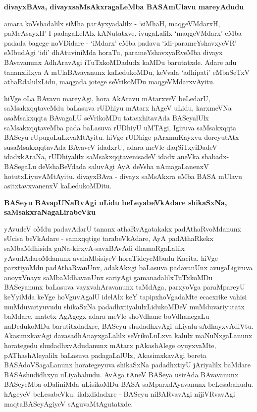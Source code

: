 {\bigskip
\noindent
{\large\bf divayxBAva, divayxsaMsAkxragaLeMba BASAmUlavu mareyAdudu}}\label{page15a}
\medskip

amara koVshadalilx siMha parAyxyadalilx - `siMhaH, maqgeVMdarxH, paMcAsayxH' I padagaLelAlx kANutatxve. ivugaLalilx `maqgeVMdarx' eMba padada bagege noVDidare - `iMdarx' eMba padavu `idi-parameYshavxyeVR' eMbudAgi `idi' dhAtuviniMda horaTu, parameYshavxyaRveMba divayx BAvavanunx AdhAravAgi iTuTxkoMDadudx kaMDu barutatxde. Adare adu tananxlilxya A mUlaBAvavanunx kaLedukoMDu, keVvala `adhipati' eMbaSeTxV athaRdalulxLidu, maqgada jotege seVrikoMDu maqgeVMdarxvAyitu.

hiVge oLa BAvavu mareyAgi, hora AkAravu mAtarxveV beLedarU, saMsakxqqtaveMdu baLasuva rUDhiyu mAtarx hAgeV uLidu, karxmeVNa asaMsakxqqta BAvagaLU seVrikoMDu tatasxhitavAda BASeyalUlx saMsakxqqtaveMba pada baLasuva rUDhiyU uMTAgi, Igiruva saMsakxqqta BASeyu rUpugoLuLxvaMtAyitu. hiVge rUDhige pArxmuKayxvu doreyutAtx susaMsakxqqtavAda BAvaveV idadxrU, adara meVle daqSiTxyiDadeV idadxkAraNa, rUDhiyalilx saMsakxqqtavenisadeV idadx aneVka shabadx-BASegaLu deVshaBeVdada saluvAgi AyA deVsha nAmagaLanenxV hotutxLiyuvAMtAyitu. divayxBAva - divayx saMsAkxra eMba BASA mUlavu asitxtavxvanenxV kaLedukoMDitu.

{\bigskip
\noindent
{\large\bf BASeyu BAvapUNaRvAgi uLidu beLeyabeVkAdare shikaSxNa, saMsakxraNagaLirabeVku}}\label{page16}
\medskip

\noindent
yAvudeV oMdu padavAdarU tananx athaRvAgatakakx padAthaRvoMdanunx sUcisa beVkAdare - samxqqtige tarabeVkAdare, AyA padAthaRkekx saMbaMdhisida guNa-kirxyA-savxBAvAdi dhamaRgaLalilx yAvudAdaroMdanunx avalaMbisiyeV horaTideyeMbudu Kacita. hiVge parxtiyoMdu padAthaRvanUnx, adakAkxgi baLasuva padavanUnx avugaLigiruva anoyxVnayx saMbaMdhavanUnx sariyAgi gamanadalilxTuTxkoMDu BASeyanunx baLasuva vayxvahAravanunx taMdAga, parxyoVga paraMpareyU \hbox{keYyiMda} keYge hoVguvAgalU idelAlx keY tapipxhoVgadaMte ecacxrike vahisi muMduvariyuvudu shikaSxNa padadhxtiyalulxLidukoMDeV muMduvariyutatx baMdare, matetx AgAgegx adara meVle shoVdhane boVdhanegaLu naDedukoMDu barutitxdadxre, BASeyu shudadhxvAgi uLiyalu sAdhayxvAdiVtu. AkasimxkavAgi davasadhAnayxgaLalilx seVrikoLuLxva kalulx maNuNxgaLanunx horategedu shudadhxvAdudanunx mAtarx pAkashAlege oyuyxvaMte, pAThashAleyalilx baLasuva padagaLalUlx, AkasimxkavAgi bereta BASAdoVSagaLanunx horategeyuva shikaSxNa padadhxtiyU jAriyalilx baMdare BASAshudidhxyu uLiyabahudu. AvAga tAneV BASeya usirAda BAvavanunx BASeyeMba oDaliniMda uLisikoMDu BASA-saMparxdAyavanunx beLesabahudu. hAgeyeV beLesabeVku. ilalxdidadxre - BASeyu niBARvavAgi nijiVRvavAgi maqtaBASeyAgiyeV sAguvaMtAgutatxde.

